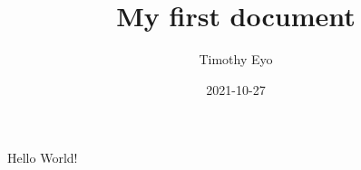 \documentclass{article}
\title{My first document}
\date{2021-10-27}
\author{Timothy Eyo}
\begin{document}
	\maketitle
	\newpage
	Hello World!
\end{document}
